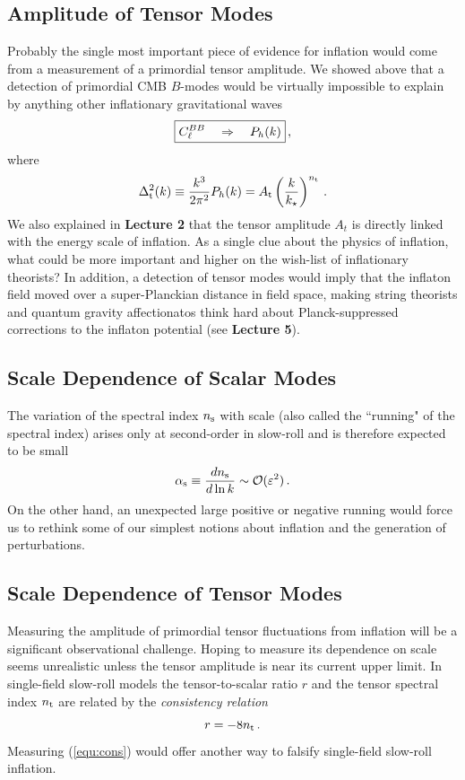 \documentclass[12pt,letterpaper,rotate]{article}
\def\beq{\begin{equation}}
\def\eeq{\end{equation}}
\begin{document}
{\subsection{Amplitude of Tensor Modes}

Probably the single most important piece of evidence for inflation would come from a measurement of a primordial tensor amplitude.
We showed above that a detection of primordial CMB $B$-modes would be virtually impossible to explain by anything other inflationary gravitational waves~\cite{BauZal}
\beq
\fbox{$\displaystyle
C_\ell^{BB} \quad \Rightarrow \quad P_h(k) $}\, ,
\eeq
where
\beq
\Delta^2_{\rm t}(k) \equiv \frac{k^3}{2\pi^2} P_h(k) = A_{\rm t} \left(\frac{k}{k_\star} \right)^{n_{\rm t}} \, .
\eeq
We also explained in {\bf Lecture 2} that the tensor amplitude $A_t$ is directly linked with the energy scale of inflation.
As a single clue about the physics of inflation, what could be more important and higher on the wish-list of inflationary theorists?
In addition, a detection of tensor modes would imply that the inflaton field moved over a super-Planckian distance in field space, making string theorists and quantum gravity affectionatos think hard about Planck-suppressed corrections to the inflaton potential (see {\bf Lecture 5}).

\subsection{Scale Dependence of Scalar Modes}

The variation of the spectral index $n_{\rm s}$ with scale (also called the ``running" of the spectral index) arises only at second-order in slow-roll and is therefore expected to be small
\beq
\alpha_{\rm s} \equiv \frac{d n_{\rm s}}{d \ln k} \sim {\cal O}(\varepsilon^2)\, .
\eeq
On the other hand, an unexpected large positive or negative running would force us to rethink some of our simplest notions about inflation and the generation of perturbations.

\subsection{Scale Dependence of Tensor Modes}

Measuring the amplitude of primordial tensor fluctuations from inflation will be a significant observational challenge.
Hoping to measure its dependence on scale seems unrealistic unless the tensor amplitude is near its current upper limit.
In 
single-field slow-roll models the tensor-to-scalar ratio $r$ and the tensor spectral index $n_{\rm t}$
are related by the 
{\it consistency relation}
\beq
\label{equ:cons}
r = - 8 n_{\rm t}\, .
\eeq
Measuring (\ref{equ:cons})
would offer another way to falsify single-field slow-roll inflation.

}
\end{document}
